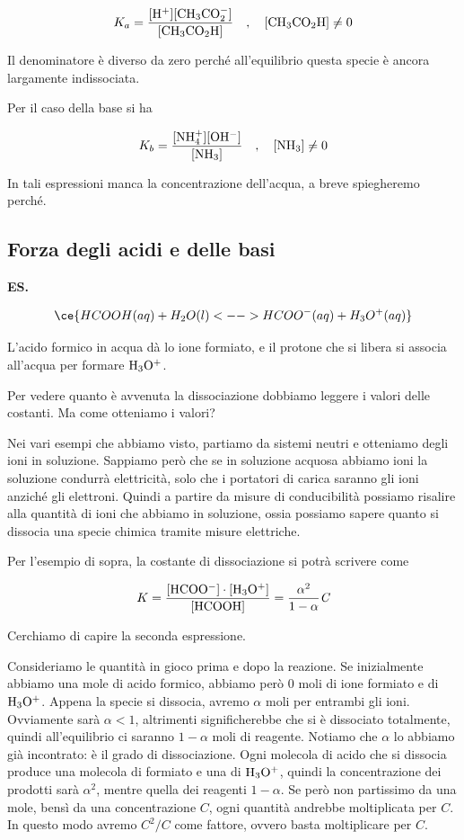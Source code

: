 $$K_a=\rm{\frac{[H^+][CH_3CO_2^-]}{[CH_3CO_2H]}}
\quad,\quad
[CH_3CO_2H] \neq 0$$

Il denominatore è diverso da zero perché all'equilibrio questa specie è ancora largamente indissociata.

Per il caso della base si ha

$$K_b=\rm{\frac{[NH_4^+][OH^-]}{[NH_3]}}
\quad,\quad
[NH_3] \neq 0$$

In tali espressioni manca la concentrazione dell'acqua, a breve spiegheremo perché.
\subsection{Forza degli acidi e delle basi}\label{par:forza_degli_acidi_e_delle_basi}
\textbf{ES.}

$$\ce{HCOOH(aq) + H_2O(l) <--> HCOO^-(aq) + H_3O^+(aq)}$$

L'acido formico in acqua dà lo ione formiato, e il protone che si libera si associa all'acqua per formare $\rm H_3O^+$.

Per vedere quanto è avvenuta la dissociazione dobbiamo leggere i valori delle costanti. Ma come otteniamo i valori?

Nei vari esempi che abbiamo visto, partiamo da sistemi neutri e otteniamo degli ioni in soluzione. Sappiamo però che se in soluzione acquosa abbiamo ioni la soluzione condurrà elettricità, solo che i portatori di carica saranno gli ioni anziché gli elettroni. Quindi a partire da misure di conducibilità possiamo risalire alla quantità di ioni che abbiamo in soluzione, ossia possiamo sapere quanto si dissocia una specie chimica tramite misure elettriche.

Per l'esempio di sopra, la costante di dissociazione si potrà scrivere come

$$K= \rm{\frac{[HCOO^-]\cdot[H_3O^+]}{[HCOOH]}} = \frac{\alpha^2}{1- \alpha}\textit{C}$$

Cerchiamo di capire la seconda espressione.

Consideriamo le quantità in gioco prima e dopo la reazione. Se inizialmente abbiamo una mole di acido formico, abbiamo però 0 moli di ione formiato e di $\rm H_3O^+$. Appena la specie si dissocia, avremo $\alpha$ moli per entrambi gli ioni. Ovviamente sarà $\alpha<1$, altrimenti significherebbe che si è dissociato totalmente, quindi all'equilibrio ci saranno $1-\alpha$ moli di reagente. Notiamo che $\alpha$ lo abbiamo già incontrato: è il grado di dissociazione. Ogni molecola di acido che si dissocia produce una molecola di formiato e una di $\rm H_3O^+$, quindi la concentrazione dei prodotti sarà $\alpha^2$, mentre quella dei reagenti $1-\alpha$. Se però non partissimo da una mole, bensì da una concentrazione $C$, ogni quantità andrebbe moltiplicata per $C$. In questo modo avremo $C^2/C$ come fattore, ovvero basta moltiplicare per $C$.

